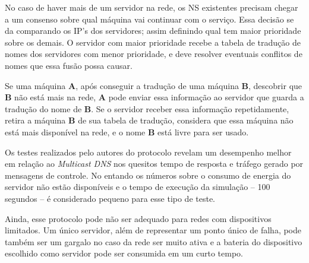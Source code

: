     No caso de haver mais de um servidor na rede, os NS existentes precisam
    chegar a um consenso sobre qual máquina vai continuar com o serviço. Essa
    decisão se da comparando os IP's dos servidores; assim definindo
    qual tem maior prioridade sobre os demais. O servidor com maior prioridade recebe
    a tabela de tradução de nomes dos servidores com menor prioridade, e deve resolver
    eventuais conflitos de nomes que essa fusão possa causar.
  
    Se uma máquina \textbf{A}, após conseguir a tradução de uma máquina \textbf{B},
    descobrir que \textbf{B} não está mais na rede, \textbf{A} pode enviar essa 
    informação ao servidor que guarda a tradução do nome de \textbf{B}. Se o servidor
    receber essa informação repetidamente, retira a máquina \textbf{B} de sua 
    tabela de tradução, considera que essa máquina não está mais disponível na 
    rede, e o nome \textbf{B} está livre para ser usado.
  
    Os testes realizados pelo autores do protocolo revelam um desempenho melhor
    em relação ao \textit{Multicast DNS} nos quesitos tempo de resposta e tráfego
    gerado por mensagens de controle. No entando os números sobre o consumo de 
    energia do servidor não estão disponíveis e o tempo de execução da simulação
    -- 100 segundos -- é considerado pequeno para esse tipo de teste.
    
    Ainda, esse protocolo pode não ser adequado para redes com dispositivos
    limitados. Um único servidor, além de representar um ponto único de falha,
    pode também ser um gargalo no caso da rede ser muito ativa e a bateria do
    dispositivo escolhido como servidor pode ser consumida em um curto tempo.